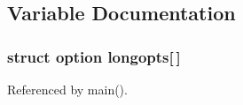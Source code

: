 \subsection{Variable Documentation}
\subsubsection[{longopts}]{\setlength{\rightskip}{0pt plus 5cm}struct option {\bf longopts}[$\,$]\hspace{0.3cm}{\ttfamily  [static]}}\label{upk_8c_a94965649155359a4c4eb047af782bf22}


Referenced by main().

